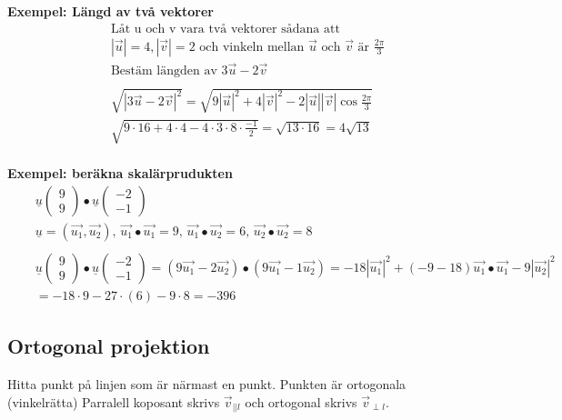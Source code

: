 \textbf{Exempel: Längd av två vektorer}
\begin{align*}
  &\quad  \text{Låt u och v vara två vektorer sådana att} \\
  &\quad  |\vec{u}|=4, |\vec{v}|=2 \text{ och vinkeln mellan $\vec{u}$ och $\vec{v}$ är } \frac{2\pi}{3} \\
  &\quad  \text{Bestäm längden av } 3\vec{u}-2\vec{v} \\
  &\quad  \\
  &\quad  \sqrt{|3\vec{u}-2\vec{v}|^2} =
  \sqrt{ 9|\vec{u}|^2 + 4|\vec{v}|^2 - 2|\vec{u}||\vec{v}|\cos{\frac{2\pi}{3}}}  \\
  &\quad  \sqrt{9\cdot{}16 + 4\cdot{}4 - 4\cdot{}3\cdot{}8\cdot{\frac{-1}{2}} } =
  \sqrt{13\cdot{}16} = 4\sqrt{13} \\
\end{align*}

\textbf{Exempel: beräkna skalärprudukten}
\begin{align*}
  &\quad  \underline{u}\begin{pmatrix} 9 \\ 9 \end{pmatrix} \bullet
  \underline{u}\begin{pmatrix} -2 \\ -1 \end{pmatrix} \\
  &\quad  \underline{u}=(\vec{u_1},\vec{u_2}), \, \vec{u_1}\bullet\vec{u_1}=9, \,
  \vec{u_1}\bullet\vec{u_2}=6, \, \vec{u_2}\bullet\vec{u_2}=8 \\
  &\quad  \\
  &\quad  \underline{u}\begin{pmatrix} 9 \\ 9 \end{pmatrix} \bullet
  \underline{u}\begin{pmatrix} -2 \\ -1 \end{pmatrix} =
  (9\vec{u_1}-2\vec{u_2})\bullet(9\vec{u_1}-1\vec{u_2}) =
  -18|\vec{u_1}|^2+(-9-18)\vec{u_1}\bullet\vec{u_1}-9|\vec{u_2}|^2 \\
  &\quad = -18\cdot{9}-27\cdot(6)-9\cdot{8} =-396
\end{align*}


\newpage

\subsection{Ortogonal projektion}
Hitta punkt på linjen som är närmast en punkt. Punkten är ortogonala (vinkelrätta) \newline
Parralell koposant skrivs $\vec{v}_{||{l}}$ och ortogonal skrivs $\vec{v}_{\perp{l}}$.

